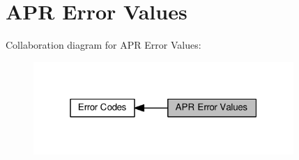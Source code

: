 \hypertarget{group__APR__Error}{}\section{A\+PR Error Values}
\label{group__APR__Error}
Collaboration diagram for A\+PR Error Values\+:
\nopagebreak
\begin{figure}[H]
\begin{center}
\leavevmode
\includegraphics[width=280pt]{group__APR__Error}
\end{center}
\end{figure}

